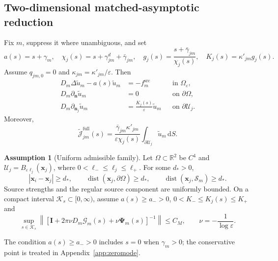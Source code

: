 \documentclass[pdflatex,sn-mathphys-num]{sn-jnl}
\numberwithin{equation}{section}
\theoremstyle{thmstyleone}%
\theoremstyle{definition}
\newtheorem{assumption}[theorem]{Assumption}
\theoremstyle{remark}
\begin{document}
\begin{appendices}
\section{Two-dimensional matched-asymptotic reduction}
\label{app:matched2d}

Fix $m$, suppress it where unambiguous, and set
\[
a(s)=s+\gamma_m,\quad
\chi_j(s)=s+\gamma^d_{jm}+\bar\gamma_{jm},\quad
g_j(s)=\frac{s+\bar\gamma_{jm}}{\chi_j(s)},\quad
K_j(s)=\kappa'_{jm}g_j(s).
\]
Assume $q_{jm,0}=0$ and $\kappa_{jm}=\kappa'_{jm}/\varepsilon$. Then
\begin{subequations}
\begin{align*}
D_m\Delta\widetilde u_m-a(s)\widetilde u_m
&=-f_m^{\mathrm{src}}
&&\text{in }\Omega_\varepsilon,\\
D_m\partial_{\mathbf n}\widetilde u_m&=0
&&\text{on }\partial\Omega,\\
D_m\partial_{\mathbf n_j}\widetilde u_m
&=\frac{K_j(s)}{\varepsilon}\widetilde u_m
&&\text{on }\partial\mathcal U_j.
\end{align*}
\end{subequations}
Moreover,
\begin{equation*}
\widetilde{\mathcal J}^{\mathrm{full}}_{jm}(s)
=\frac{\bar\gamma_{jm}\kappa'_{jm}}{\varepsilon\chi_j(s)}
\int_{\partial\mathcal U_j}\widetilde u_m\,\mathrm dS.
\end{equation*}

\begin{assumption}[Uniform admissible family]
\label{ass:app_uniform_family}
Let $\Omega\subset\mathbb R^2$ be $C^4$ and
$\mathcal U_j=B_{\varepsilon\ell_j}(\mathbf x_j)$, where
$0<\ell_-\leq\ell_j\leq\ell_+$. For some $d_*>0$,
\[
|\mathbf x_i-\mathbf x_j|\geq d_*,\qquad
\operatorname{dist}(\mathbf x_j,\partial\Omega)\geq d_*,\qquad
\operatorname{dist}(\mathbf x_j,\mathcal S_m)\geq d_*.
\]
Source strengths and the regular source component are uniformly bounded. On a
compact interval $\mathcal K_s\subset[0,\infty)$, assume
$a(s)\geq a_->0$, $0<K_-\leq K_j(s)\leq K_+$ and
\begin{equation*}
\sup_{s\in\mathcal K_s}
\left\|\left[
\mathbf I+2\pi\nu D_m\bm{\mathcal G}_m(s)+\nu\bm\Psi_m(s)
\right]^{-1}\right\|\leq C_M,
\qquad \nu=-\frac1{\log\varepsilon}.
\end{equation*}
\end{assumption}

The condition $a(s)\geq a_->0$ includes $s=0$ when $\gamma_m>0$; the
conservative point is treated in Appendix~\ref{app:zeromode}.


\end{appendices}
\end{document}
